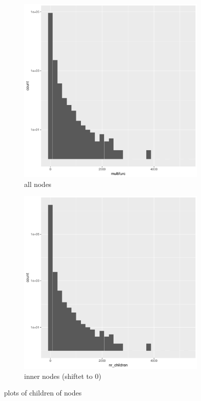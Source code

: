       \begin{figure}
        \begin{subfigure}{.5\textwidth}
          \centering
          \includegraphics[width=.8\linewidth]{Figures/multifurc.pdf}
          \caption{all nodes}
        \end{subfigure}%
        \begin{subfigure}{.5\textwidth}
          \centering
          \includegraphics[width=.8\linewidth]{Figures/nr_children.pdf}
          \caption{inner nodes (shiftet to 0)}
        \end{subfigure}
        \caption{plots of children of nodes}
        \label{fig:childrenOfNodes}
        \end{figure}

